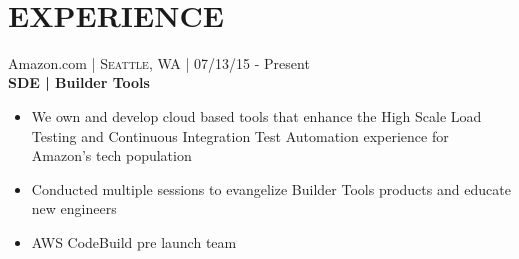 \documentclass[10pt]{article} %
\begin{document}
\color{text1} %


\par{\\ %
	

\begin{minipage}[t]{0.57\textwidth} %
\vspace{0pt} %
	

\section{\uppercase{\textbf{Experience}}}



{\raggedright\large Amazon.com \normalsize\textsc{ | Seattle, WA} | 07/13/15 - Present \\
\textbf{SDE | Builder Tools}\\[5pt]}
\vspace{0pt}
\begin{itemize}\itemsep-0.25em
    \item We own and develop cloud based tools that enhance the High Scale Load Testing and Continuous Integration Test Automation experience for Amazon's tech population
    \item Conducted multiple sessions to evangelize Builder Tools products and educate new engineers
    \item AWS CodeBuild pre launch team
\end{itemize}\\


\end{minipage}}
\end{document}

